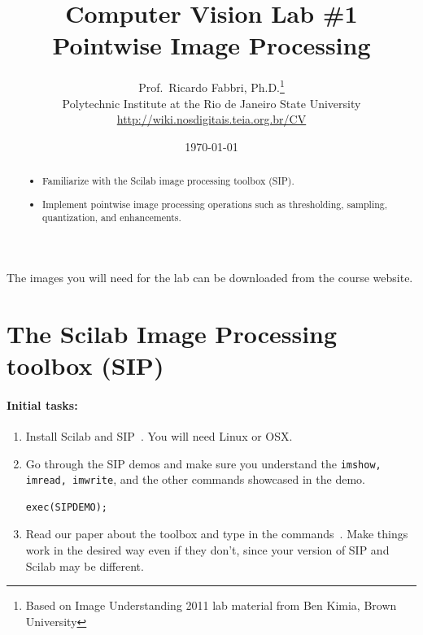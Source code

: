 \documentclass[a4paper]{article}
\begin{document}
\title{\textsf{Computer Vision Lab \#1\\ Pointwise Image Processing}
} 

\author{Prof.\ Ricardo Fabbri, Ph.D.\footnote{Based on Image Understanding
2011 lab material from Ben Kimia, Brown University}\\[1em]
Polytechnic Institute at the Rio de Janeiro State University\\
\url{http://wiki.nosdigitais.teia.org.br/CV}
}
 

\date{\today}
\maketitle
\begin{abstract}
\noindent\begin{itemize}
\item Familiarize with the Scilab image
processing toolbox (SIP).
\item Implement pointwise image processing operations such as thresholding,
sampling, quantization, and enhancements.
\end{itemize}
\end{abstract}
\vspace{2em}



The images you will need for the lab can be downloaded from the course
website.

\section{The Scilab Image Processing toolbox (SIP)}

\paragraph{Initial tasks:}
\begin{enumerate}
\item Install Scilab and SIP~\cite{scilab,Fabbri:etal:Arxiv2012}. You will need Linux or OSX.
\item Go through the SIP demos and make sure you understand the \texttt{imshow, imread,
imwrite}, and the other commands showcased in the demo.
\begin{lstlisting}[numbers=none]
exec(SIPDEMO);
\end{lstlisting}
\item Read our paper about the toolbox and type in the commands~\cite{scilab,Fabbri:etal:Arxiv2012}.
Make things work in the desired way even if they don't, since your version of
SIP and Scilab may be different.
\end{enumerate}
\end{document}
